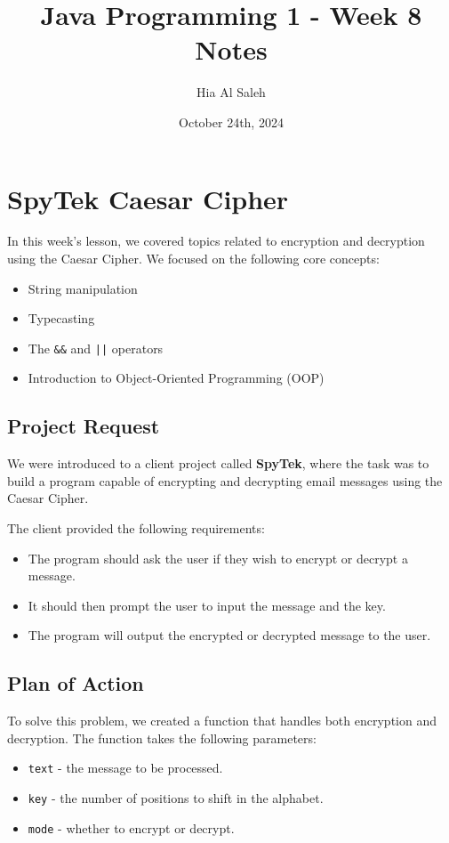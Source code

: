 \documentclass{article}
\title{Java Programming 1 - Week 8 Notes}
\author{Hia Al Saleh}
\date{October 24th, 2024}
\begin{document}
\maketitle
\tableofcontents
\newpage 

\section{SpyTek Caesar Cipher}
In this week's lesson, we covered topics related to encryption and decryption using the Caesar Cipher. We focused on the following core concepts:
\begin{itemize}
    \item String manipulation
    \item Typecasting
    \item The \texttt{\&\&} and \texttt{||} operators
    \item Introduction to Object-Oriented Programming (OOP)
\end{itemize}

\subsection{Project Request}
We were introduced to a client project called \textbf{SpyTek}, where the task was to build a program capable of encrypting and decrypting email messages using the Caesar Cipher.

The client provided the following requirements:
\begin{itemize}
    \item The program should ask the user if they wish to encrypt or decrypt a message.
    \item It should then prompt the user to input the message and the key.
    \item The program will output the encrypted or decrypted message to the user.
\end{itemize}

\subsection{Plan of Action}
To solve this problem, we created a function that handles both encryption and decryption. The function takes the following parameters:
\begin{itemize}
    \item \texttt{text} - the message to be processed.
    \item \texttt{key} - the number of positions to shift in the alphabet.
    \item \texttt{mode} - whether to encrypt or decrypt.
\end{itemize}
\end{document}
